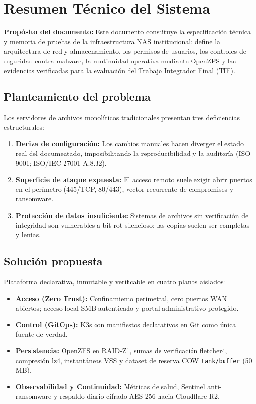 \documentclass[10pt,a4paper]{article}
\begin{document}
\newpage
\section*{Resumen Técnico del Sistema}

\begin{normativabox}{}
\textbf{Propósito del documento:} Este documento constituye la especificación técnica y memoria de pruebas de la infraestructura NAS institucional: define la arquitectura de red y almacenamiento, los permisos de usuarios, los controles de seguridad contra malware, la continuidad operativa mediante OpenZFS y las evidencias verificadas para la evaluación del Trabajo Integrador Final (TIF).
\end{normativabox}

\subsection*{Planteamiento del problema}
Los servidores de archivos monolíticos tradicionales presentan tres deficiencias estructurales:
\begin{enumerate}
    \item \textbf{Deriva de configuración:} Los cambios manuales hacen diverger el estado real del documentado, imposibilitando la reproducibilidad y la auditoría (ISO 9001; ISO/IEC 27001 A.8.32).
    \item \textbf{Superficie de ataque expuesta:} El acceso remoto suele exigir abrir puertos en el perímetro (445/TCP, 80/443), vector recurrente de compromisos y ransomware.
    \item \textbf{Protección de datos insuficiente:} Sistemas de archivos sin verificación de integridad son vulnerables a bit-rot silencioso; las copias suelen ser completas y lentas.
\end{enumerate}

\subsection*{Solución propuesta}
Plataforma declarativa, inmutable y verificable en cuatro planos aislados:
\begin{itemize}
    \item \textbf{Acceso (Zero Trust):} Confinamiento perimetral, cero puertos WAN abiertos; acceso local SMB autenticado y portal administrativo protegido.
    \item \textbf{Control (GitOps):} K3s con manifiestos declarativos en Git como única fuente de verdad.
    \item \textbf{Persistencia:} OpenZFS en RAID-Z1, sumas de verificación fletcher4, compresión lz4, instantáneas VSS y dataset de reserva COW \texttt{tank/buffer} (50 MB).
    \item \textbf{Observabilidad y Continuidad:} Métricas de salud, Sentinel anti-ransomware y respaldo diario cifrado AES-256 hacia Cloudflare R2.
\end{itemize}
\end{document}
